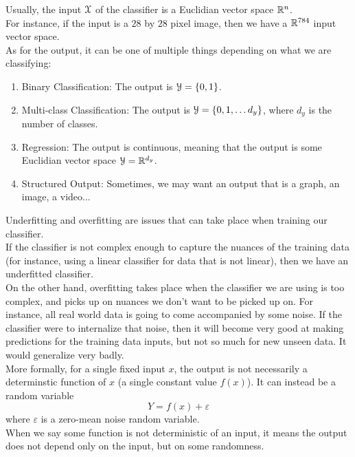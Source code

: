 \documentclass[12pt]{article}
\begin{document}
Usually, the input $\mathcal{X}$
of the classifier is a Euclidian
vector space $\mathbb{R}^n$. \\
For instance, if the input 
is a $28$ by $28$ pixel image,
then we have a $\mathbb{R}^{784}$
input vector space. \\

As for the output,
it can be one of multiple
things depending on what we
are classifying:
\begin{enumerate}
    \item 
    Binary Classification:
    The output is $\mathcal{Y} = \{0, 1\}$.
    \item 
    Multi-class Classification:
    The output is $\mathcal{Y} = \{0, 1,
    \dots d_y \}$,
    where $d_y$ is the number of classes.
    \item 
    Regression:
    The output is continuous,
    meaning that
    the output is some Euclidian
    vector space $\mathcal{Y} = \mathbb{R}^{d_y}$.
    \item 
    Structured Output:
    Sometimes, we may want
    an output that is a graph, 
    an image, a video... \\
\end{enumerate} 

Underfitting and overfitting
are issues that can take place
when training our classifier. \\
If the classifier is not complex
enough to capture the nuances
of the training data
(for instance, using a linear
classifier for data that is not linear),
then we have an underfitted classifier. \\
On the other hand,
overfitting takes place when the
classifier we are using is too complex,
and picks up on nuances we don't want
to be picked up on.
For instance, all real world data
is going to come accompanied by some
noise.
If the classifier were to internalize
that noise, then it will
become very good at making predictions
for the training data inputs,
but not so much for new unseen data.
It would generalize very badly. \\

More formally, for a single fixed
input $x$,
the output is not necessarily
a determinstic function of $x$
(a single constant value $f(x)$).
It can instead be a random variable 
\[ Y = f(x) + \varepsilon \]
where $\varepsilon$
is a zero-mean noise random variable. \\
When we say some function is not
deterministic of an input,
it means the output does not depend
only on the input,
but on some randomness. \\
\end{document}
